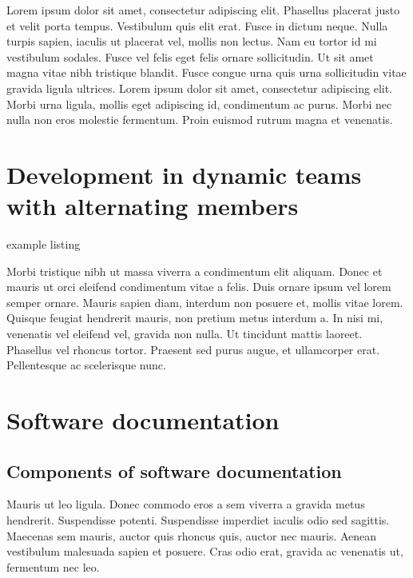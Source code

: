 Lorem ipsum dolor sit amet, consectetur adipiscing elit. Phasellus placerat
justo et velit porta tempus. Vestibulum quis elit erat. Fusce in dictum neque.
Nulla turpis sapien, iaculis ut placerat vel, mollis non lectus. Nam eu tortor
id mi vestibulum sodales. Fusce vel felis eget felis ornare sollicitudin. Ut
sit amet magna vitae nibh tristique blandit. Fusce congue urna quis urna
sollicitudin vitae gravida ligula ultrices. Lorem ipsum dolor sit amet,
consectetur adipiscing elit. Morbi urna ligula, mollis eget adipiscing id,
condimentum ac purus. Morbi nec nulla non eros molestie fermentum. Proin
euismod rutrum magna et venenatis. 


\newpage
\section{Development in dynamic teams with alternating members}

example listing


Morbi tristique nibh ut massa viverra a condimentum elit aliquam. Donec et
mauris ut orci eleifend condimentum vitae a felis. Duis ornare ipsum vel lorem
semper ornare. Mauris sapien diam, interdum non posuere et, mollis vitae
lorem. Quisque feugiat hendrerit mauris, non pretium metus interdum a. In nisi
mi, venenatis vel eleifend vel, gravida non nulla. Ut tincidunt mattis
laoreet. Phasellus vel rhoncus tortor. Praesent sed purus augue, et
ullamcorper erat. Pellentesque ac scelerisque nunc. 
 
\newpage
\section{Software documentation}
\FloatBarrier %


\subsection{Components of software documentation}
Mauris ut leo ligula. Donec commodo eros a sem viverra a gravida metus
hendrerit. Suspendisse potenti. Suspendisse imperdiet iaculis odio sed
sagittis. Maecenas sem mauris, auctor quis rhoncus quis, auctor nec mauris.
Aenean vestibulum malesuada sapien et posuere. Cras odio erat, gravida ac
venenatis ut, fermentum nec leo.

